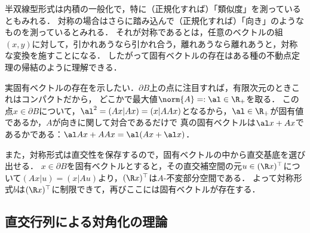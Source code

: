 \documentclass[uplatex, dvipdfmx]{jsreport}
\begin{document}
\begin{remarks}[固有ベクトルの存在の幾何学的な理解]
    半双線型形式は内積の一般化で，特に（正規化すれば）「類似度」を測っているともみれる．
    対称の場合はさらに踏み込んで（正規化すれば）「向き」のようなものを測っているとみれる．
    それが対称であるとは，任意のベクトルの組$(x,y)$に対して，引かれあうなら引かれ合う，離れあうなら離れあうと，対称な変換を施すことになる．
    したがって固有ベクトルの存在はある種の不動点定理の帰結のように理解できる．

    実固有ベクトルの存在を示したい．$\partial B$上の点に注目すれば，有限次元のときこれはコンパクトだから，
    どこかで最大値$\norm{A}=:\al\in\R_+$を取る．
    この点$x\in\partial B$について，$\al^2=(Ax|Ax)=(x|AAx)$となるから，$\al\in\R_+$が固有値であるか，$A$が向きに関して対合であるだけで
    真の固有ベクトルは$\al x+Ax$であるかである：$\al Ax+AAx=\al(Ax+\al x)$．

    また，対称形式は直交性を保存するので，固有ベクトルの中から直交基底を選び出せる．
    $x\in\partial B$を固有ベクトルとすると，その直交補空間の元$u\in (\R x)^\top$について$(Ax|u)=(x|Au)$より，$(\R x)^\top$は$A$-不変部分空間である．
    よって対称形式$b$は$(\R x)^\top$に制限できて，再びここには固有ベクトルが存在する．
\end{remarks}

\subsection{直交行列による対角化の理論}
\end{document}

